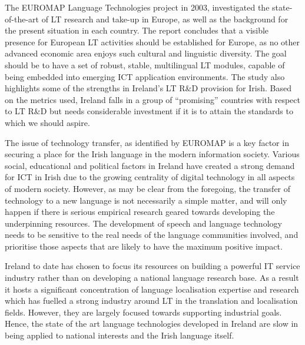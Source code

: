 \begin{multicols}{2}
The EUROMAP Language Technologies \cite{euromap} project in 2003, investigated the state-of-the-art of LT research and take-up in Europe, as well as the background for the present situation in each country. The report concludes that a visible presence for European LT activities should be established for Europe, as no other advanced economic area enjoys such cultural and linguistic diversity. The goal should be to have a set of robust, stable, multilingual LT modules, capable of being embedded into emerging ICT application environments. The study also highlights some of the strengths in Ireland’s  LT R\&D provision for Irish. Based on the metrics used, Ireland falls in a group of ``promising'' countries with respect to LT R\&D but  needs considerable investment if it is to attain the standards to which we should aspire.

The issue of technology transfer, as identified by EUROMAP is a key factor in securing a place for the Irish language in the modern information society. Various social, educational and political factors in Ireland have created a strong demand for ICT in Irish due to the growing centrality of digital technology in all aspects of modern society. However, as may be clear from the foregoing, the transfer of technology to a new language is not necessarily a simple matter, and will only happen if there is serious empirical research geared towards developing the underpinning resources. The development of speech and language technology needs to be sensitive to the real needs of the language communities involved, and prioritise those aspects that are likely to have the maximum positive impact.

Ireland to date has chosen to focus its resources on building a powerful IT service industry rather than on developing a national language research base. As a result it hosts a significant concentration of language localisation expertise and research which has fuelled a strong industry around LT in the translation and localisation fields. However, they are largely focused towards supporting industrial goals. Hence, the state of the art language technologies developed in Ireland are slow in being applied to national interests and the Irish language itself.


\end{multicols}

